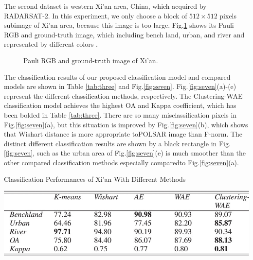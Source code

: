 \documentclass[11pt, a4paper, onecolumn, oneside]{article}
\begin{document}
The second dataset is western Xi’an area, China, which acquired by RADARSAT-2. In this experiment, we only choose a block of $512\times 512$ pixels subimage of Xi’an area, because this image is too large. Fig.\ref{fig:six} shows its Pauli RGB and ground-truth image, which including bench land, urban, and river and represented by different colors \cite{c}.


\begin{figure}
\caption{Pauli RGB and ground-truth image of Xi’an.}
\label{fig:six}
\end{figure}

The classification results of our proposed classification model and compared models are shown in Table \ref{tab:three} and Fig.\ref{fig:seven}. Fig.\ref{fig:seven}(a)-(e) represent the different classification methods, respectively. The Clustering-WAE classification model achieves the highest OA and Kappa coefficient, which has been bolded in Table \ref{tab:three}. There are so many misclassification pixels in Fig.\ref{fig:seven}(a), but this situation is improved by Fig.\ref{fig:seven}(b), which shows that Wishart distance is more appropriate toPOLSAR image than F-norm. The distinct different classification results are shown by a black rectangle in Fig.\ref{fig:seven}, such as the urban area of Fig.\ref{fig:seven}(e) is much smoother than the other compared classification methods especially comparedto Fig.\ref{fig:seven}(a).

\begin{table}
  \caption{Classification Performances of Xi’an With Different Methods}
  \label{tab:three}
  \includegraphics[width=\linewidth]{table_3.jpg}
\end{table}
\end{document}
